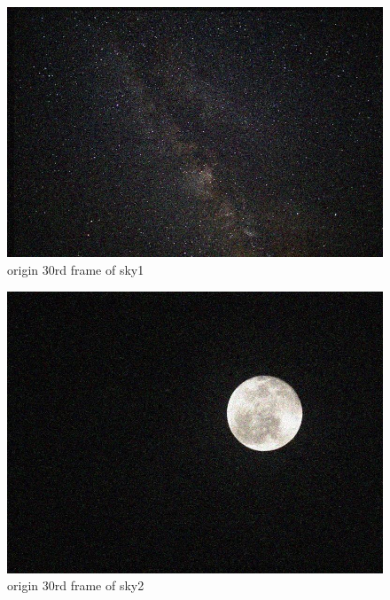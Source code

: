 \documentclass[
	12pt, %
]{fphw}
\begin{document}
\begin{figure}[H]
 
	\centering
	\includegraphics[width=1\columnwidth]{T1/result/sky1origin_30.jpg} %
	\caption{origin 30rd frame of sky\underline{\hspace{0.5em}}1}
	\label{fig1}
\end{figure}
\begin{figure}[H]
 
	\centering
	\includegraphics[width=1\columnwidth]{T1/result/sky2origin_30.jpg} %
	\caption{origin 30rd frame of sky\underline{\hspace{0.5em}}2}
	\label{fig2}
	 
\end{figure}
\end{document}
